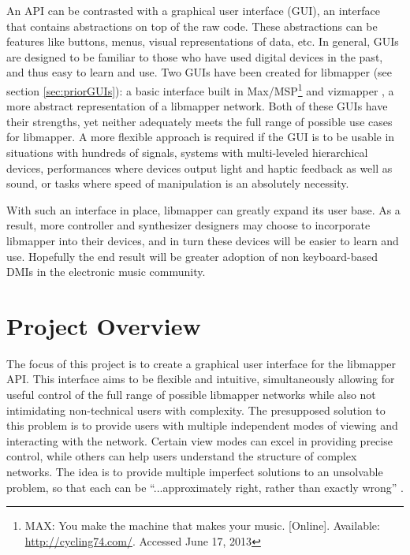 An API can be contrasted with a graphical user interface (GUI), an interface that contains abstractions on top of the raw code. These abstractions can be features like buttons, menus, visual representations of data, etc. In general, GUIs are designed to be familiar to those who have used digital devices in the past, and thus easy to learn and use. Two GUIs have been created for libmapper (see section \ref{sec:priorGUIs}): a basic interface built in Max/MSP\footnote{MAX: You make the machine that makes your music. [Online]. Available: \url{http://cycling74.com/}. Accessed June 17, 2013} and vizmapper \cite{vizmapper}, a more abstract representation of a libmapper network. Both of these GUIs have their strengths, yet neither adequately meets the full range of possible use cases for libmapper. A more flexible approach is required if the GUI is to be usable in situations with hundreds of signals, systems with multi-leveled hierarchical devices, performances where devices output light and haptic feedback as well as sound, or tasks where speed of manipulation is an absolutely necessity. 

With such an interface in place, libmapper can greatly expand its user base. As a result, more controller and synthesizer designers may choose to incorporate libmapper into their devices, and in turn these devices will be easier to learn and use. Hopefully the end result will be greater adoption of non keyboard-based DMIs in the electronic music community.


\section{Project Overview}

The focus of this project is to create a graphical user interface for the libmapper API. This interface aims to be flexible and intuitive, simultaneously allowing for useful control of the full range of possible libmapper networks while also not intimidating non-technical users with complexity. The presupposed solution to this problem is to provide users with multiple independent modes of viewing and interacting with the network. Certain view modes can excel in providing precise control, while others can help users understand the structure of complex networks. The idea is to provide multiple imperfect solutions to an unsolvable problem, so that each can be ``...approximately right, rather than exactly wrong'' .


